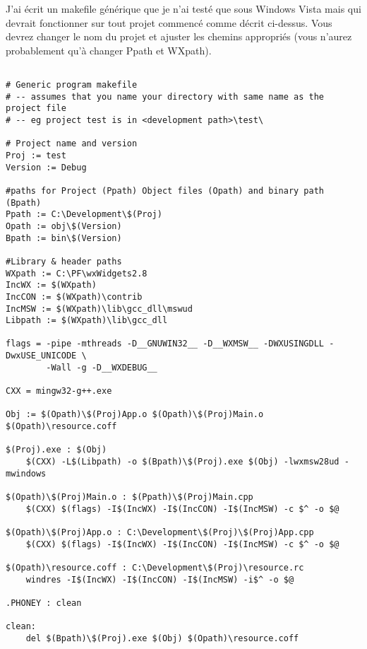 J'ai écrit un makefile générique que je n'ai testé que sous Windows Vista mais qui devrait fonctionner sur tout projet commencé comme décrit ci-dessus. Vous devrez changer le nom du projet et ajuster les chemins appropriés (vous n'aurez probablement qu'à changer Ppath et WXpath).

\begin{verbatim}  

# Generic program makefile
# -- assumes that you name your directory with same name as the project file
# -- eg project test is in <development path>\test\

# Project name and version
Proj := test
Version := Debug

#paths for Project (Ppath) Object files (Opath) and binary path (Bpath)
Ppath := C:\Development\$(Proj)
Opath := obj\$(Version)
Bpath := bin\$(Version)

#Library & header paths
WXpath := C:\PF\wxWidgets2.8
IncWX := $(WXpath)
IncCON := $(WXpath)\contrib
IncMSW := $(WXpath)\lib\gcc_dll\mswud
Libpath := $(WXpath)\lib\gcc_dll

flags = -pipe -mthreads -D__GNUWIN32__ -D__WXMSW__ -DWXUSINGDLL -DwxUSE_UNICODE \ 
        -Wall -g -D__WXDEBUG__

CXX = mingw32-g++.exe

Obj := $(Opath)\$(Proj)App.o $(Opath)\$(Proj)Main.o $(Opath)\resource.coff

$(Proj).exe : $(Obj)
    $(CXX) -L$(Libpath) -o $(Bpath)\$(Proj).exe $(Obj) -lwxmsw28ud -mwindows

$(Opath)\$(Proj)Main.o : $(Ppath)\$(Proj)Main.cpp
    $(CXX) $(flags) -I$(IncWX) -I$(IncCON) -I$(IncMSW) -c $^ -o $@

$(Opath)\$(Proj)App.o : C:\Development\$(Proj)\$(Proj)App.cpp
    $(CXX) $(flags) -I$(IncWX) -I$(IncCON) -I$(IncMSW) -c $^ -o $@

$(Opath)\resource.coff : C:\Development\$(Proj)\resource.rc
    windres -I$(IncWX) -I$(IncCON) -I$(IncMSW) -i$^ -o $@

.PHONEY : clean

clean:
    del $(Bpath)\$(Proj).exe $(Obj) $(Opath)\resource.coff
\end{verbatim}



